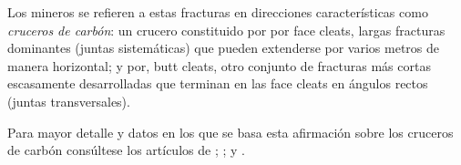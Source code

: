 \setlength{\epigraphwidth}{0.9\textwidth}
\epigraph{Los mineros se refieren a estas fracturas en direcciones caracter\'isticas como \textit{cruceros de carb\'on}: un crucero constituido por por face cleats, largas fracturas dominantes (juntas sistem\'aticas) que pueden extenderse por varios metros de manera horizontal; y por, butt cleats, otro conjunto de fracturas m\'as cortas escasamente desarrolladas que terminan en las face cleats en \'angulos rectos (juntas transversales).}{\citet{davis_structural_2011}}



Para mayor detalle y datos en los que se basa esta afirmaci\'on sobre los cruceros de carb\'on cons\'ultese los art\'iculos de \citet{rodrigues_coal_2014}; \citet{laubach_characteristics_1998}; y \citet{datta_coal_2016}. 


